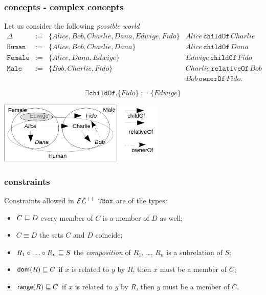 \documentclass[8pt]{beamer}
\newcommand{\TBox}{{\tt TBox}}
\newcommand{\Human}{\mathtt{Human}}
\newcommand{\Male}{\mathtt{Male}}
\newcommand{\Female}{\mathtt{Female}}
\newcommand{\relative}{\mathtt{relativeOf}}
\newcommand{\child}{\mathtt{childOf}}
\newcommand{\owner}{\mathtt{ownerOf}}
\newcommand{\Alice}{Alice}
\newcommand{\Bob}{Bob}
\newcommand{\Charlie}{Charlie}
\newcommand{\Dana}{Dana}
\newcommand{\Edwige}{Edwige}
\newcommand{\Fido}{Fido}
\begin{document}
\begin{frame}
 \frametitle{\elplusplus concepts - complex concepts}
 Let us consider the following \emph{possible world}
 \[
 \begin{array}{rcl|l}
  \Delta & := & \{ \Alice, \Bob, \Charlie, \Dana, \Edwige, \Fido \} & \Alice\,\child\,\Charlie \\
  \Human & := & \{ \Alice, \Bob, \Charlie, \Dana \} & \Alice\,\child\,\Dana\\
  \Female & := & \{ \Alice, \Dana, \Edwige \} & \Edwige\,\child\,\Fido\\
  \Male & := & \{ \Bob, \Charlie, \Fido \} & \Charlie\,\relative\,\Bob \\
  & & & \Bob\,\owner\,\Fido .
 \end{array}
\]

\[
 \exists \child.\{\Fido\} := \{ \Edwige \}
\]

 \begin{center}
  \includegraphics[width=300px, keepaspectratio]{images/excomplex_big.png}  
 \end{center}
\end{frame}

\begin{frame}
 \frametitle{\elplusplus constraints}
 Constraints allowed in $\mathcal{EL}^{++}$ $\TBox$ are of the types:
 \begin{itemize}
  \item $C \sqsubseteq D$ every member of $C$ is a member of $D$ as well;
  \item $C \equiv D$ the sets $C$ and $D$ coincide;
  \item $R_1 \circ \ldots \circ R_n \sqsubseteq S$ the \emph{composition} of $R_1$, \ldots, $R_n$ is a subrelation of
  $S$;
  \item $\mathsf{dom}(R) \sqsubseteq C$ if $x$ is related to $y$ by $R$, then $x$ must be a member of $C$;
  \item $\mathsf{range}(R) \sqsubseteq C$ if $x$ is related to $y$ by $R$, then $y$ must be a member of $C$.  
 \end{itemize}
\end{frame}
\end{document}
